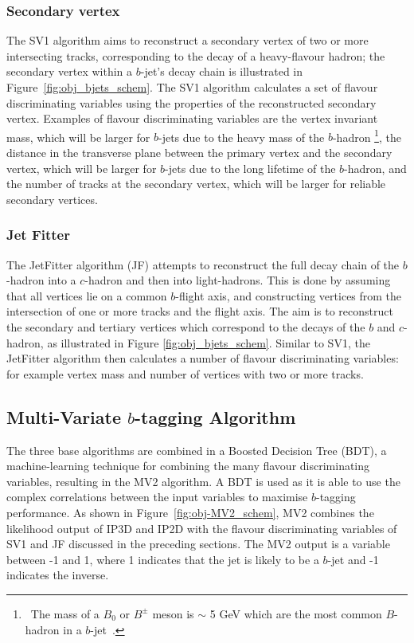 \subsubsection{Secondary vertex}
\label{sec:obj-bjets_SV}

The SV1 algorithm aims to reconstruct a secondary vertex of two or more intersecting tracks, corresponding to the decay of a heavy-flavour hadron;
the secondary vertex within a $b$-jet's decay chain is illustrated in Figure~\ref{fig:obj_bjets_schem}.
The SV1 algorithm calculates a set of flavour discriminating variables using the properties of the reconstructed secondary vertex.
Examples of flavour discriminating variables are the vertex invariant mass,
which will be larger for $b$-jets due to the heavy mass of the $b$-hadron
\footnote{\ The mass of a $B_0$ or $B^\pm$ meson is $\sim$ 5 GeV which are the most common $B$-hadron in a $b$-jet~\cite{obj-bjets_PDG}.}, 
the distance in the transverse plane between the primary vertex and the secondary vertex, %
which will be larger for $b$-jets due to the long lifetime of the $b$-hadron,
and the number of tracks at the secondary vertex, which will be larger for reliable secondary vertices.

\subsubsection{Jet Fitter}
\label{sec:obj-bjets_JF}

The JetFitter algorithm (JF) attempts to reconstruct the full decay chain of the $b$-hadron into a $c$-hadron and then into light-hadrons. 
This is done by assuming that all vertices lie on a common $b$-flight axis, and constructing vertices from the intersection of
one or more tracks and the flight axis.
The aim is to reconstruct the secondary and tertiary vertices which correspond to the decays of the $b$ and $c$-hadron,
as illustrated in Figure \ref{fig:obj_bjets_schem}.
Similar to SV1, the JetFitter algorithm then calculates a number of flavour discriminating variables:
for example vertex mass and number of vertices with two or more tracks.

\subsection{Multi-Variate $b$-tagging Algorithm}
\label{sec:obj-bjets_MV2}

The three base algorithms are combined in a Boosted Decision Tree (BDT), a machine-learning technique for combining the many flavour discriminating variables,
resulting in the MV2 algorithm.
A BDT is used as it is able to use the complex correlations between the input variables to maximise $b$-tagging performance.
As shown in Figure~\ref{fig:obj-MV2_schem}, MV2 combines the likelihood output of IP3D and IP2D
with the flavour discriminating variables of SV1 and JF discussed in the preceding sections.
The MV2 output is a variable between -1 and 1, where 1 indicates that the jet is likely to be a $b$-jet and -1 indicates the inverse.

